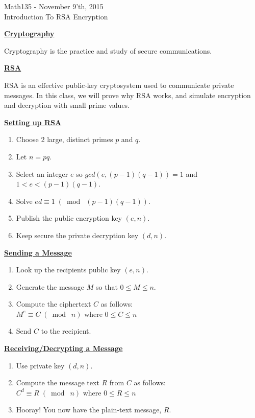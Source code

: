 \documentclass{letter}
\begin{document}
	\begin{center}
		\LARGE Math135 - November 9'th, 2015\\
		\large Introduction To RSA Encryption
	\end{center}
	\vspace{0.25 in}
	\underline{\textbf{Cryptography}}
	
	Cryptography is the practice and study of secure communications.
	
	\underline{\textbf{RSA}}
	
	RSA is an effective public-key cryptosystem used to communicate private messages. In this class, we will prove why RSA works, and simulate encryption and decryption with small prime values.
	
	\underline{\textbf{Setting up RSA}}
	\begin{enumerate}[1)]
		\item Choose 2 large, distinct primes $p$ and $q$.
		\item Let $n = pq$.
		\item Select an integer $e$ so $gcd(e, (p-1)(q-1)) = 1$ and $1 < e < (p-1)(q-1)$.
		\item Solve $ed \equiv 1\;(\bmod\; (p-1)(q-1))$.
		\item Publish the public encryption key $(e, n)$.
		\item Keep secure the private decryption key $(d, n)$.
	\end{enumerate}
	\underline{\textbf{Sending a Message}}
	\begin{enumerate}[1)]
		\item Look up the recipients public key $(e, n)$.
		\item Generate the message $M$ so that $0 \leq M \leq n$.
		\item Compute the ciphertext $C$ as follows:\\
		$M^e \equiv C\;(\bmod\; n)$ where $0 \leq C \leq n$
		\item Send $C$ to the recipient.
	\end{enumerate}
	\underline{\textbf{Receiving/Decrypting a Message}}
	\begin{enumerate}[1)]
		\item Use private key $(d, n)$.
		\item Compute the message text $R$ from $C$ as follows:\\
		$C^d \equiv R\;(\bmod\; n)$ where $0 \leq R \leq n$
		\item Hooray! You now have the plain-text message, $R$.
	\end{enumerate}
\end{document}
